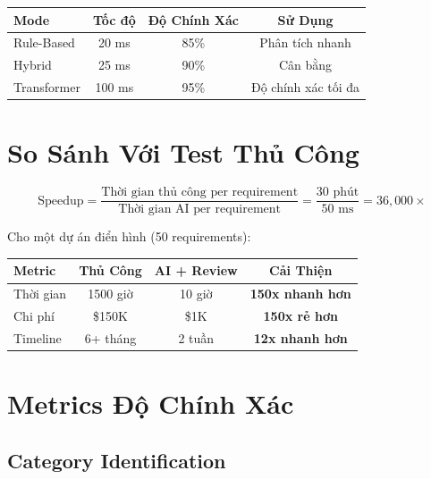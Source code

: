 \documentclass[12pt,oneside]{report}
\begin{document}
\begin{table}[H]
\centering
\begin{tabular}{|l|c|c|c|}
\hline
\textbf{Mode} & \textbf{Tốc độ} & \textbf{Độ Chính Xác} & \textbf{Sử Dụng} \\
\hline
Rule-Based & 20 ms & 85\% & Phân tích nhanh \\
Hybrid & 25 ms & 90\% & Cân bằng \\
Transformer & 100 ms & 95\% & Độ chính xác tối đa \\
\hline
\end{tabular}
\end{table}

\section{So Sánh Với Test Thủ Công}

\begin{equation}
\text{Speedup} = \frac{\text{Thời gian thủ công per requirement}}{\text{Thời gian AI per requirement}} = \frac{30 \text{ phút}}{50 \text{ ms}} = 36,000\times
\end{equation}

Cho một dự án điển hình (50 requirements):

\begin{table}[H]
\centering
\begin{tabular}{|l|c|c|c|}
\hline
\textbf{Metric} & \textbf{Thủ Công} & \textbf{AI + Review} & \textbf{Cải Thiện} \\
\hline
Thời gian & 1500 giờ & 10 giờ & \textbf{150x nhanh hơn} \\
Chi phí & \$150K & \$1K & \textbf{150x rẻ hơn} \\
Timeline & 6+ tháng & 2 tuần & \textbf{12x nhanh hơn} \\
\hline
\end{tabular}
\end{table}

\section{Metrics Độ Chính Xác}

\subsection{Category Identification}
\end{document}
